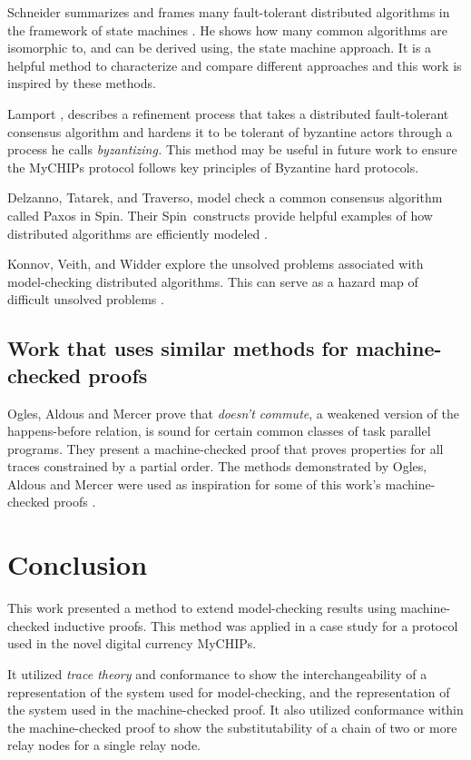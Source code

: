 \documentclass[runningheads]{llncs}
\newcommand{\spin}{Spin}
\newif\ifcomments
\newif\ifkylecomments
\newcommand{\egm}[1]{\ifcomments\textcolor{orange}{egm: #1}\fi}
\newcommand{\krs}[1]{\ifkylecomments\textcolor{blue}{krs: #1}\fi}
\begin{document}
 Schneider summarizes and frames many fault-tolerant distributed algorithms in the framework of state machines \cite{StateMachine}. He shows how many common algorithms are isomorphic to, and can be derived using, the state machine approach. It is a helpful method to characterize and compare different approaches and this work is inspired by these methods.
 
 Lamport \cite{Lamport}, describes a refinement process that takes a distributed fault-tolerant consensus algorithm and hardens it to be tolerant of byzantine actors through a process he calls \emph{byzantizing.} This method may be useful in future work to ensure the MyCHIPs protocol follows key principles of Byzantine hard protocols.
 
 Delzanno, Tatarek, and Traverso, model check a common consensus algorithm called Paxos in \spin. Their \spin\ constructs provide helpful examples of how distributed algorithms are efficiently modeled \cite{Delzanno_2014}.
 
 Konnov, Veith, and Widder explore the unsolved problems associated with model-checking distributed algorithms. This can serve as a hazard map of difficult unsolved problems \cite{Konnov}.

\subsection{Work that uses similar methods for machine-checked proofs}
 Ogles, Aldous and Mercer prove that \emph{doesn't commute}, a weakened version of the happens-before relation, is sound for certain common classes of task parallel programs. They present a machine-checked proof that proves properties for all traces constrained by a partial order. The methods demonstrated by Ogles, Aldous and Mercer were used as inspiration for some of this work's machine-checked proofs \cite{ben_DC}.
 
\section{Conclusion}
\label{sec:conclusion}
\krs{Hopefully this is more then just boilerplate\egm{Add a conclusion!!}}
This work presented a method to extend model-checking results using machine-checked inductive proofs. This method was applied in a case study for a protocol used in the novel digital currency MyCHIPs. 

It utilized \emph{trace theory} and conformance to show the interchangeability of a representation of the system used for model-checking, and the representation of the system used in the machine-checked proof. It also utilized conformance within the machine-checked proof to show the substitutability of a chain of two or more relay nodes for a single relay node.
\end{document}
